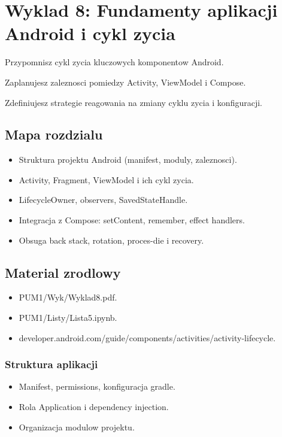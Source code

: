 \chapter{Wyklad 8: Fundamenty aplikacji Android i cykl zycia}

\begin{learningobjectives}
  \item Przypomnisz cykl zycia kluczowych komponentow Android.
  \item Zaplanujesz zaleznosci pomiedzy Activity, ViewModel i Compose.
  \item Zdefiniujesz strategie reagowania na zmiany cyklu zycia i konfiguracji.
\end{learningobjectives}

\section{Mapa rozdzialu}
\begin{itemize}
  \item Struktura projektu Android (manifest, moduly, zaleznosci).
  \item Activity, Fragment, ViewModel i ich cykl zycia.
  \item LifecycleOwner, observers, SavedStateHandle.
  \item Integracja z Compose: setContent, remember, effect handlers.
  \item Obsuga back stack, rotation, proces-die i recovery.
\end{itemize}

\section{Material zrodlowy}
\begin{itemize}
  \item PUM1/Wyk/Wyklad8.pdf.
  \item PUM1/Listy/Lista5.ipynb.
  \item developer.android.com/guide/components/activities/activity-lifecycle.
\end{itemize}

\subsection{Struktura aplikacji}
\begin{itemize}
  \item Manifest, permissions, konfiguracja gradle.
  \item Rola Application i dependency injection.
  \item Organizacja modulow projektu.
\end{itemize}

